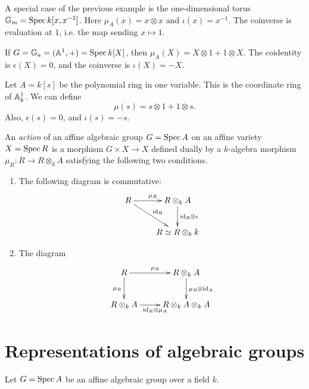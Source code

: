 \documentclass[11pt, english]{article}
\begin{document}
\begin{example}
A special case of the previous example is the one-dimensional torus $\mathbb{G}_m=\operatorname{Spec} k[x,x^{-1}]$. Here $\mu_A(x)=x \otimes x$ and $\iota(x)=x^{-1}$. The coinverse is evaluation at $1$, i.e. the map sending $x \mapsto 1$.
\end{example}

\begin{example}
If $G=\mathbb{G}_a=(\mathbb{A}^1,+)=\operatorname{Spec} k[X]$, then $\mu_A(X)=X \otimes 1 + 1 \otimes X$. The coidentity is $\epsilon(X)=0$, and the coinverse is $\iota(X)=-X$.
\end{example}

\begin{example}
 Let $A=k[s]$ be the polynomial ring in one variable. This is the coordinate ring of $\mathbb{A}_k^1$. We can define
$$
\mu(s) = s \otimes 1 + 1 \otimes s.
$$
Also, $\epsilon(s)=0$, and $\iota(s)=-s$.
\end{example}


\begin{defi}
\label{defaction}
An \emph{action} of an affine algebraic group $G = \operatorname{Spec} A$ on an affine variety $X= \operatorname{Spec} R$ is a morphism $G \times X \to X$ defined dually by a $k$-algebra morphism $\mu_R : R \to R \otimes_k A$ satisfying the following two conditions.
\begin{enumerate}
\item  The following diagram is commutative:
\[
\xymatrix{
R \ar[dr]^{\id_R} \ar[r]^{\mu_R} & R \otimes_k A \ar[d]^{\id_R \otimes \epsilon} \\
 & R \simeq R \otimes_k k
}
\]
\item The diagram
\[
\xymatrix{
R \ar[r]^{\mu_R} \ar[d]_{\mu_R} & R \otimes_k A \ar[d]^{\mu_R \otimes \id_A} \\
R \otimes_k A \ar[r]_{\id_R \otimes \mu_A} & R \otimes _k A \otimes_k A
}
\]
\end{enumerate}
\end{defi}


\section{Representations of algebraic groups}

Let $G = \operatorname{Spec} A$ be an affine algebraic group over a field $k$.
\end{document}
